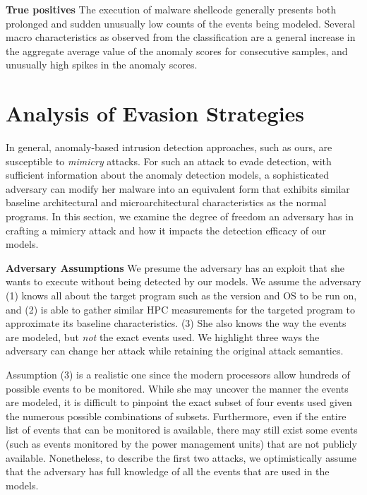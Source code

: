 \documentclass{acm_proc_article-sp}
\begin{document}
	\textbf{True positives} \space\space The execution of malware shellcode generally presents both prolonged and sudden unusually low counts of the events being modeled. Several macro characteristics as observed from the classification are a general increase in the aggregate average value of the anomaly scores for consecutive samples, and unusually high spikes in the anomaly scores.
	
	\fi 




\section{Analysis of Evasion Strategies}
\label{sec:evasion}
In general, anomaly-based intrusion detection approaches, such as ours, 
are susceptible to \textit{mimicry} attacks. For such an attack to evade 
detection, with sufficient information about the anomaly detection models, 
a sophisticated adversary can modify her malware into an equivalent form
that exhibits similar baseline architectural and microarchitectural 
characteristics as the normal programs. In this section, we examine the degree 
of freedom an adversary has in crafting a mimicry attack and how it impacts the 
detection efficacy of our models. 

\textbf{Adversary Assumptions} \space\space We presume the adversary has 
an exploit that she wants to execute without being detected by our models. 
We assume the adversary (1) knows all about the target 
program such as the version and OS to be run on, and (2) is able to 
gather similar HPC measurements for the targeted program to approximate 
its baseline characteristics. (3) She also knows the way the events are modeled, but \textit{not} the exact events used. We highlight three ways 
the adversary can change her attack while retaining the original 
attack semantics.

Assumption (3) is a realistic one since the modern processors allow 
hundreds of possible events to be monitored. While she may uncover the 
manner the events are modeled, it is difficult to pinpoint the exact 
subset of four events used given the numerous possible combinations of 
subsets. Furthermore, even if the entire list of events that can be 
monitored is available, there may still exist some events (such as events
monitored by the power management units) that are not publicly available.
Nonetheless, to describe the first two attacks, we optimistically assume 
that the adversary has full knowledge of all the events that are used in 
the models.
\end{document}
